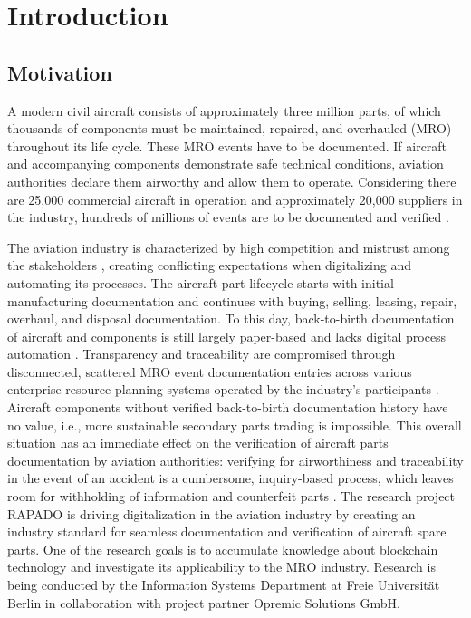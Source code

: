\chapter{Introduction}
\section{Motivation}
A modern civil aircraft consists of approximately three million parts, of which thousands of components must be maintained, repaired, and overhauled (MRO) throughout its life cycle. These MRO events have to be documented. If aircraft and accompanying components demonstrate safe technical conditions, aviation authorities declare them airworthy and allow them to operate. Considering there are 25,000 commercial aircraft in operation and approximately 20,000 suppliers in the industry, hundreds of millions of events are to be documented and verified \citep{mroBCservices1}.

The aviation industry is characterized by high competition and mistrust among the stakeholders \cite{Chatzi2019TDoC}, creating conflicting expectations when digitalizing and automating its processes. The aircraft part lifecycle starts with initial manufacturing documentation and continues with buying, selling, leasing, repair, overhaul, and disposal documentation. To this day, back-to-birth documentation of aircraft and components is still largely paper-based and lacks digital process automation \citep{efthymiou}. Transparency and traceability are compromised through disconnected, scattered MRO event documentation entries across various enterprise resource planning systems operated by the industry's participants \citep{mroBCservices1}. Aircraft components without verified back-to-birth documentation history have no value, i.e., more sustainable secondary parts trading is impossible. This overall situation has an immediate effect on the verification of aircraft parts documentation by aviation authorities: verifying for airworthiness and traceability in the event of an accident is a cumbersome, inquiry-based process, which leaves room for withholding of information and counterfeit parts \citep{planecrash}. 
The research project RAPADO is driving digitalization in the aviation industry by creating an industry standard for seamless documentation and verification of aircraft spare parts. One of the research goals is to accumulate knowledge about blockchain technology and investigate its applicability to the MRO industry. Research is being conducted by the Information Systems Department at Freie Universit{\"a}t Berlin in collaboration with project partner Opremic Solutions GmbH.

